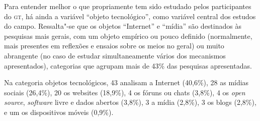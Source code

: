 Para entender melhor o que propriamente tem sido estudado pelos
participantes do \textsc{gt}, há ainda a variável ``objeto tecnológico'', como
variável central dos estudos do campo. Ressalta"-se que os objetos
``Internet'' e ``mídia'' são destinados às pesquisas mais gerais, com um
objeto empírico ou pouco definido (normalmente, mais presentes em
reflexões e ensaios sobre os meios no geral) ou muito abrangente (no
caso de estudar simultaneamente vários dos mecanismos apresentados),
categorias que agrupam mais de 43\% das pesquisas apresentadas.

Na categoria objetos tecnológicos, 43 analisam a Internet (40,6\%), 28 as mídias sociais (26,4\%), 20 os websites (18,9\%), 4 os fóruns ou chats (3,8\%), 4 os \textit{open source}, \textit{software} livre e dados abertos (3,8\%), 3 a mídia (2,8\%), 3 os blogs (2,8\%), e um os dispositivos móveis (0,9\%).

